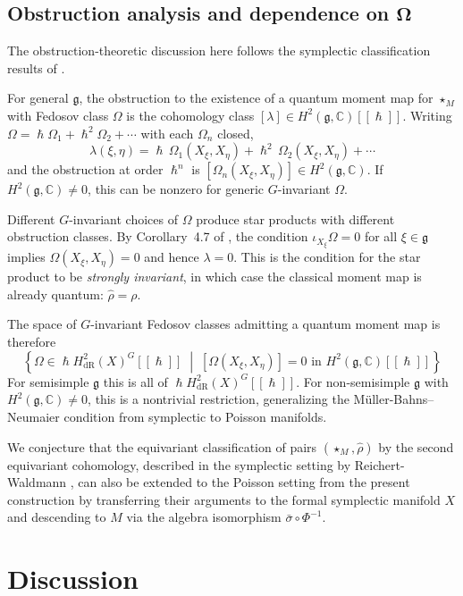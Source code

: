 \documentclass[
  12pt,
  a4paper, oneside
]{report}
\renewcommand{\hbar}{\hslash}
\theoremstyle{bolddef}
\theoremstyle{remark}
\numberwithin{equation}{chapter}
\begin{document}
\section*{Obstruction analysis and dependence on  \texorpdfstring{$\boldsymbol\Omega$}{Omega}}
The obstruction-theoretic discussion here follows the symplectic classification results of \cite{MBN,RW}.


For general $\mathfrak{g}$, the obstruction to the existence of a quantum moment map for $\star_M$ with Fedosov class $\Omega$ is the cohomology class $[\lambda] \in H^2(\mathfrak{g}, \mathbb{C})[[\hbar]]$. Writing $\Omega = \hbar\Omega_1 + \hbar^2\Omega_2 + \cdots$ with each $\Omega_n$ closed,
\[
\lambda(\xi, \eta) = \hbar\, \Omega_1(X_\xi, X_\eta) + \hbar^2\, \Omega_2(X_\xi, X_\eta) + \cdots
\]
and the obstruction at order $\hbar^n$ is $[\Omega_n(X_\xi, X_\eta)] \in H^2(\mathfrak{g}, \mathbb{C})$. If $H^2(\mathfrak{g}, \mathbb{C}) \neq 0$, this can be nonzero for generic $G$-invariant $\Omega$.

Different $G$-invariant choices of $\Omega$ produce star products with different obstruction classes. By Corollary~4.7 of \cite{MBN}, the condition $\iota_{X_\xi}\Omega = 0$ for all $\xi \in \mathfrak{g}$ implies $\Omega(X_\xi, X_\eta) = 0$ and hence $\lambda = 0$. This is the condition for the star product to be \emph{strongly invariant}, in which case the classical moment map is already quantum: $\hat{\rho} = \rho$.

The space of $G$-invariant Fedosov classes admitting a quantum moment map is therefore
\[
\left\{\Omega \in \hbar H^2_{\mathrm{dR}}(X)^G[[\hbar]] \;\middle|\; [\Omega(X_\xi, X_\eta)] = 0 \text{ in } H^2(\mathfrak{g}, \mathbb{C})[[\hbar]] \right\}
\]
For semisimple $\mathfrak{g}$ this is all of $\hbar H^2_{\mathrm{dR}}(X)^G[[\hbar]]$. For non-semisimple $\mathfrak{g}$ with $H^2(\mathfrak{g}, \mathbb{C}) \neq 0$, this is a nontrivial restriction, generalizing the M\"uller-Bahns--Neumaier condition from symplectic to Poisson manifolds.

We conjecture that the equivariant classification of pairs $(\star_M, \hat{\rho})$ by the second equivariant cohomology, described in the symplectic setting by Reichert-Waldmann \cite{RW}, can also be extended to the Poisson setting from the present construction by transferring their arguments to the formal symplectic manifold $X$ and descending to $M$ via the algebra isomorphism $\bar{\sigma} \circ \Phi^{-1}$.
\chapter{Discussion}
\end{document}
